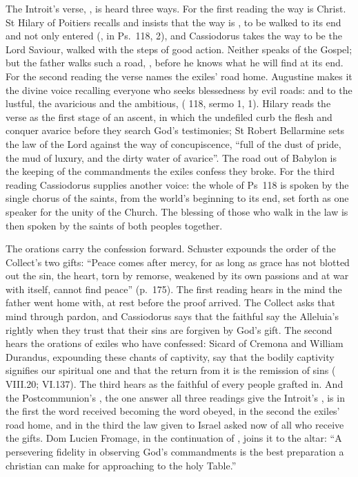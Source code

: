 The Introit's verse, , is heard three ways. For the first reading the way is Christ. St
Hilary of Poitiers recalls  and insists that the way is
, to be walked to its end and
not only entered (, in Ps.~118,  2),
and Cassiodorus takes the way to be the Lord Saviour, walked with the steps of
good action. Neither speaks of the Gospel; but the father walks such a road,
, before he knows what he will find
at its end. For the second reading the verse names the exiles' road home.
Augustine makes it the divine voice recalling everyone who seeks blessedness
by evil roads:  and to
the lustful, the avaricious and the ambitious,  ( 118, sermo 1, 1). Hilary reads the
verse as the first stage of an ascent, in which the undefiled curb the flesh
and conquer avarice before they search God's testimonies; St Robert Bellarmine
sets the law of the Lord against the way of concupiscence, ``full of the dust of
pride, the mud of luxury, and the dirty water of avarice''. The road out of
Babylon is the keeping of the commandments the exiles confess they broke. For
the third reading Cassiodorus supplies another voice: the whole of Ps~118 is
spoken by the single chorus of the saints, from the world's beginning to its
end, set forth as one speaker for the unity of the Church. The blessing of
those who walk in the law is then spoken by the saints of both peoples
together.

The orations carry the confession forward. Schuster expounds the order of the
Collect's two gifts: ``Peace comes after mercy, for as long as grace has not
blotted out the sin, the heart, torn by remorse, weakened by its own passions
and at war with itself, cannot find peace'' (p.~175). The first reading hears
in  the mind the father went home with, at rest before the
proof arrived. The Collect asks that mind through pardon, and Cassiodorus says
that the faithful say the Alleluia's  rightly when they
trust that their sins are forgiven by God's gift. The
second hears the orations of exiles who have confessed: Sicard of Cremona and
William Durandus, expounding these chants of captivity, say that the bodily
captivity signifies our spiritual one and that the return from it is the
remission of sins ( VIII.20;  VI.137). The third
hears  as the faithful of every people grafted in. And
the Postcommunion's , the one answer all three
readings give the Introit's , is in the first the word
received becoming the word obeyed, in the second the exiles' road home, and in
the third the law given to Israel asked now of all who receive the gifts. Dom
Lucien Fromage, in the continuation of , joins it to
the altar: ``A persevering fidelity in observing God's commandments is the best
preparation a christian can make for approaching to the holy Table.''

